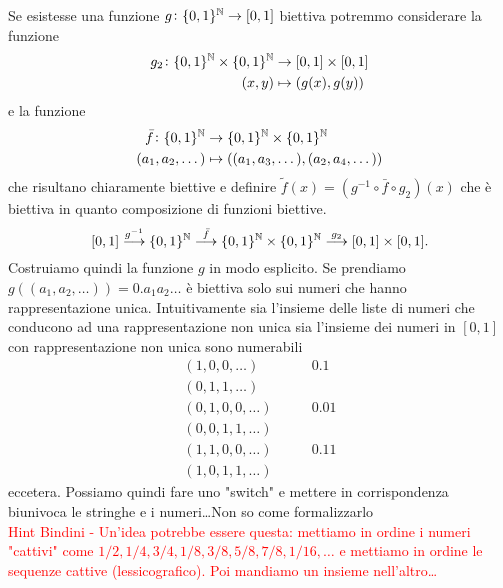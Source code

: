 Se esistesse una funzione $ g \colon \{0, 1\}^{\mathbb{N}} \to [0, 1] $ biettiva potremmo considerare la funzione
\begin{align*}
  g_2 \colon \{0, 1\}^{\mathbb{N}} \times \{0, 1\}^{\mathbb{N}} & \to [0, 1] \times [0, 1] \\
  (x, y) & \mapsto (g(x), g(y))
\end{align*}
e la funzione
\begin{align*}
  \bar{f} \colon \{0, 1\}^{\mathbb{N}} & \to \{0, 1\}^{\mathbb{N}} \times \{0, 1\}^{\mathbb{N}} \\
  (a_1, a_2, \dots ) & \mapsto ((a_1, a_3, \dots), (a_2, a_4, \dots))
\end{align*}
che risultano chiaramente biettive e definire $ \tilde{f}(x) = (g^{-1} \circ \bar{f} \circ g_2)(x) $ che è biettiva in quanto composizione di funzioni biettive.
\[[0, 1] \overset{g^{-1}}\longrightarrow \{0, 1\}^{\mathbb{N}} \overset{\bar{f}}\longrightarrow \{0, 1\}^{\mathbb{N}} \times \{0, 1\}^{\mathbb{N}} \overset{g_2}\longrightarrow [0, 1] \times [0, 1].\]
\textsf{Costruiamo quindi la funzione $ g $ in modo esplicito. Se prendiamo $ g((a_1, a_2, \dots)) = 0.a_1 a_2 \dots $ è biettiva solo sui numeri che hanno rappresentazione unica. Intuitivamente sia l'insieme delle liste di numeri che conducono ad una rappresentazione non unica sia l'insieme dei numeri in $ [0, 1] $ con rappresentazione non unica sono numerabili
  \begin{align*}
    (1, 0, 0, \dots) & \qquad 0.1 \\
    (0, 1, 1, \dots) & \\
    (0, 1, 0, 0, \dots) & \qquad 0.01 \\
    (0, 0, 1, 1, \dots) & \\
    (1, 1, 0, 0, \dots) & \qquad 0.11 \\
    (1, 0, 1, 1, \dots) &
  \end{align*}
  eccetera. Possiamo quindi fare uno "switch" e mettere in corrispondenza biunivoca le stringhe e i numeri\ldots Non so come formalizzarlo}\\

\textcolor{red}{Hint Bindini - Un'idea potrebbe essere questa: mettiamo in ordine i numeri "cattivi" come $ 1/2, 1/4, 3/4, 1/8, 3/8, 5/8, 7/8, 1/16, \ldots $ e mettiamo in ordine le sequenze cattive (lessicografico). Poi mandiamo un insieme nell'altro\ldots}


